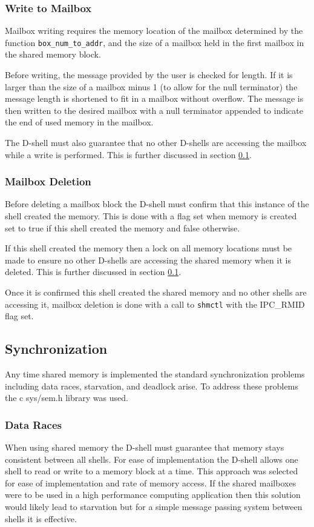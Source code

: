 \begin{multicols}{2}
\subsubsection{Write to Mailbox}
Mailbox writing requires the memory location of the mailbox determined by the function \texttt{box\_num\_to\_addr}, and the size of a mailbox held in the first mailbox in the shared memory block.  

Before writing, the message provided by the user is checked for length. If it is larger than the size of a mailbox minus 1 (to allow for the null terminator) the message length is shortened to fit in a mailbox without overflow. The message is then written to the desired mailbox with a null terminator appended to indicate the end of used memory in the mailbox.

The D-shell must also guarantee that no other D-shells are accessing the mailbox while a write is performed. This is further discussed in section \ref{synchronization}.

\subsubsection{Mailbox Deletion}
Before deleting a mailbox block the D-shell must confirm that this instance of the shell created the memory. This is done with a flag set when memory is created set to true if this shell created the memory and false otherwise. 

If this shell created the memory then a lock on all memory locations must be made to ensure no other D-shells are accessing the shared memory when it is deleted. This is further discussed in section \ref{synchronization}.

Once it is confirmed this shell created the shared memory and no other shells are accessing it, mailbox deletion is done with a call to \texttt{shmctl} with the IPC\_RMID flag set. 

\subsection{Synchronization}\label{synchronization}
Any time shared memory is implemented the standard synchronization problems including data races, starvation, and deadlock arise. To address these problems the c sys/sem.h library was used.

\subsubsection{Data Races}\label{dataraces}
When using shared memory the D-shell must guarantee that memory stays consistent between all shells. For ease of implementation the D-shell allows one shell to read or write to a memory block at a time. This approach was selected for ease of implementation and rate of memory access. If the shared mailboxes were to be used in a high performance computing application then this solution would likely lead to starvation but for a simple message passing system between shells it is effective.


\end{multicols}
